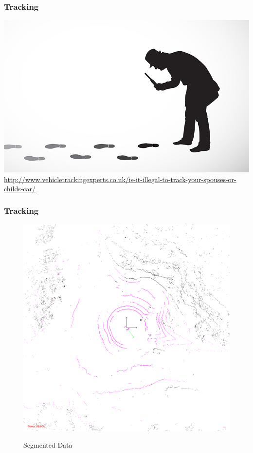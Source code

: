 \documentclass[nosymbols]{beamer}	%
\begin{document}
\begin{frame}
\frametitle{Tracking}
\begin{center}
\includegraphics[width=\textwidth,height=0.7\textheight,keepaspectratio]{bilder/detective-tracking.png}\\
\tiny{\url{http://www.vehicletrackingexperts.co.uk/is-it-illegal-to-track-your-spouses-or-childs-car/}}
\end{center}
\end{frame}


\begin{frame}
\frametitle{Tracking}
\begin{figure}[!ht]
\caption{Segmented Data}
\includegraphics[width=\textwidth,height=0.7\textheight,keepaspectratio]{bilder/Segmentation/img100084.png}
\label{segments}
\end{figure}
\end{frame}
\end{document}

